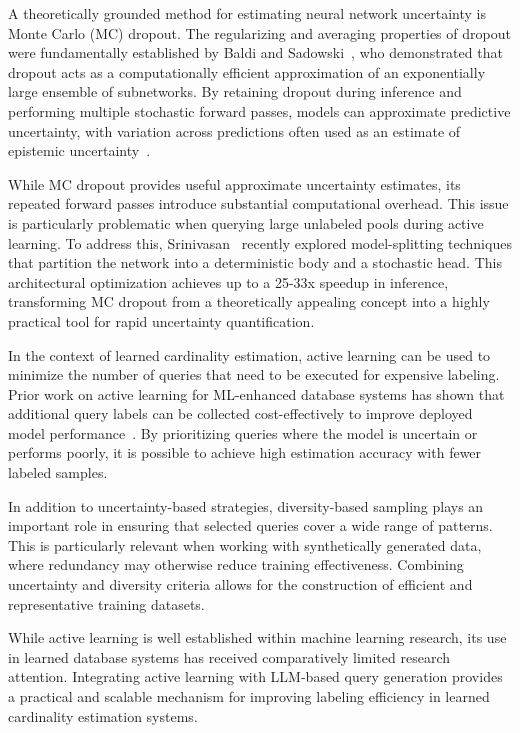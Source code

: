A theoretically grounded method for estimating neural network uncertainty is Monte Carlo (MC) dropout. The regularizing and averaging properties of dropout were fundamentally established by Baldi and Sadowski~\cite{DBLP:journals/ai/BaldiS14}, who demonstrated that dropout acts as a computationally efficient approximation of an exponentially large ensemble of subnetworks. By retaining dropout during inference and performing multiple stochastic forward passes, models can approximate predictive uncertainty, with variation across predictions often used as an estimate of epistemic uncertainty~\cite{DBLP:conf/icml/GalG16}\cite{hossain2026uatliteinferencetimeuncertaintyawareattention}.

While MC dropout provides useful approximate uncertainty estimates, its repeated forward passes introduce substantial computational overhead\cite{hossain2026uatliteinferencetimeuncertaintyawareattention}. This issue is particularly problematic when querying large unlabeled pools during active learning. To address this, Srinivasan~\cite{Srinivasan2025Efficient} recently explored model-splitting techniques that partition the network into a deterministic body and a stochastic head. This architectural optimization achieves up to a 25\--33x speedup in inference, transforming MC dropout from a theoretically appealing concept into a highly practical tool for rapid uncertainty quantification.

In the context of learned cardinality estimation, active learning can be used to minimize the number of queries that need to be executed for expensive labeling. Prior work on active learning for ML-enhanced database systems has shown that additional query labels can be collected cost-effectively to improve deployed model performance~\cite{DBLP:conf/sigmod/MaDDS20}. By prioritizing queries where the model is uncertain or performs poorly, it is possible to achieve high estimation accuracy with fewer labeled samples.

In addition to uncertainty-based strategies, diversity-based sampling plays an important role in ensuring that selected queries cover a wide range of patterns. This is particularly relevant when working with synthetically generated data, where redundancy may otherwise reduce training effectiveness. Combining uncertainty and diversity criteria allows for the construction of efficient and representative training datasets.

While active learning is well established within machine learning research, its use in learned database systems has received comparatively limited research attention. Integrating active learning with LLM-based query generation provides a practical and scalable mechanism for improving labeling efficiency in learned cardinality estimation systems.

